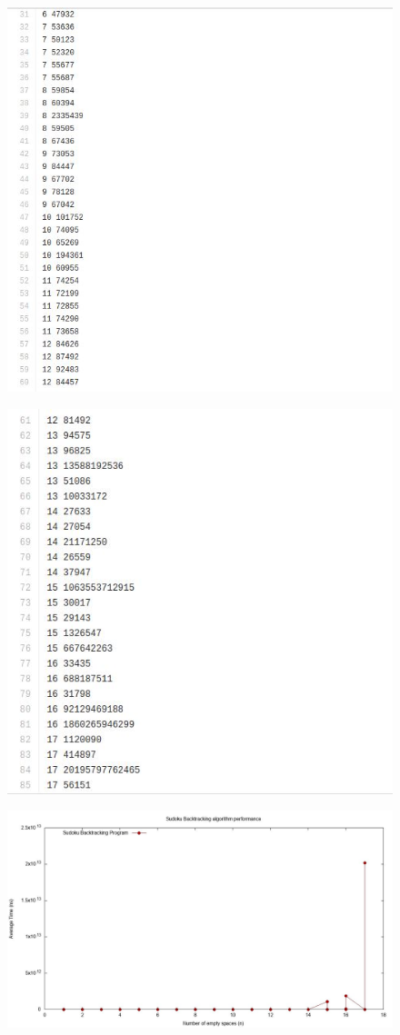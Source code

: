 \documentclass[12pt]{article}
\begin{document}
\begin{figure}[H]
\centering
\includegraphics[width=0.7\linewidth]{31-61.jpg}
\label{fig:31-61}
\end{figure}

\begin{figure}[H]
\centering
\includegraphics[width=0.7\linewidth]{61-85.jpg}
\label{fig:61-85}
\end{figure}

\begin{figure}[H]
\centering
\includegraphics[width=0.7\linewidth]{graph.jpg}
\label{fig:graph}
\end{figure}
\end{document}
